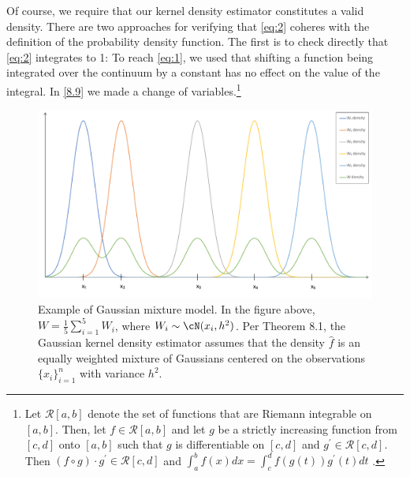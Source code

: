 Of course, we require that our kernel density estimator constitutes a valid density. There are two approaches for verifying that \eqref{eq:2} coheres with the definition of the probability density function. The first is to check directly that \eqref{eq:2} integrates to 1:
To reach \eqref{eq:1}, we used that shifting a function being integrated over the continuum by a constant has no effect on the value of the integral. In \eqref{8.9} we made a change of variables.\footnote{Let $\mathcal{R}[a, b]$ denote the set of functions that are Riemann integrable on $[a, b]$. Then, let $f \in \mathcal{R}[a, b]$ and let $g$ be a strictly increasing function from $[c, d]$ onto $[a, b]$ such that $g$ is differentiable on $[c, d]$ and $g^\prime \in \mathcal{R}[c, d]$. Then $(f \circ g) \cdot g^\prime \in \mathcal{R}[c, d]$ and $\int_a^b f(x)dx = \int_c^d f(g(t))g^\prime (t)dt$ \cite{johnsonbaugh_foundations_2010}.} 

\begin{figure}[h!]
\centering
\includegraphics[width=.8\linewidth]{figure/Lecture08/fig-1.pdf}    
\caption{Example of Gaussian mixture model. In the figure above, $W = \frac{1}{5}\sum_{i=1}^5 W_i$, where $W_i \sim \cN(x_i, h^2)$. Per Theorem 8.1, the Gaussian kernel density estimator assumes that the density $\hat{f}$ is an equally weighted mixture of Gaussians centered on the observations $\{x_i\}_{i=1}^n$ with variance $h^2$.}
\end{figure}

